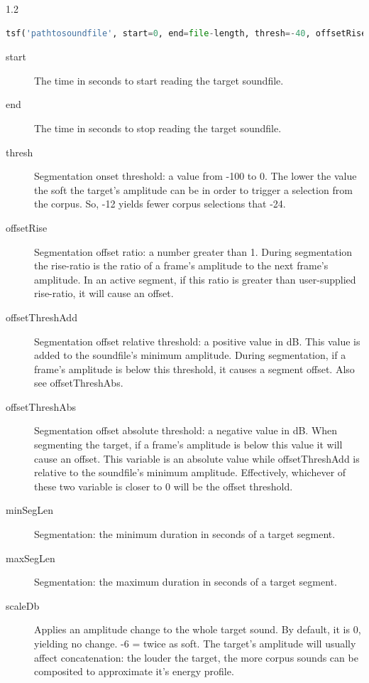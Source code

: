 \documentclass{article}
\begin{document}
\begin{spacing}{1.2}
\begin{lstlisting}[language=python]
tsf('pathtosoundfile', start=0, end=file-length, thresh=-40, offsetRise=1.5, offsetThreshAdd=+12, offsetThreshAbs=-80, scaleDb=0, minSegLen=0.05, maxSegLen=1000, midiPitchMethod='composite', stretch=1, segmentationFilepath=None)
\end{lstlisting}

\begin{description}
\item[start] The time in seconds to start reading the target soundfile.
\item[end] The time in seconds to stop reading the target soundfile.  
\item[thresh] Segmentation onset threshold: a value from -100 to 0.  The lower the value the soft the target's amplitude can be in order to trigger a selection from the corpus.  So, -12 yields fewer corpus selections that -24.  
\item[offsetRise] Segmentation offset ratio: a number greater than 1.   During segmentation the rise-ratio is the ratio of a frame's amplitude to the next frame's amplitude.   In an active segment, if this ratio is greater than user-supplied rise-ratio, it will cause an offset.
\item[offsetThreshAdd] Segmentation offset relative threshold: a positive value in dB.  
This value is added to the soundfile's minimum amplitude.  During segmentation, if a frame's amplitude is below this threshold, it causes a segment offset.  Also see offsetThreshAbs.
\item[offsetThreshAbs] Segmentation offset absolute threshold: a negative value in dB.  When segmenting the target, if a frame's amplitude is below this value it will cause an offset.  This variable is an absolute value while offsetThreshAdd is relative to the soundfile's minimum amplitude.  Effectively, whichever of these two variable is closer to 0 will be the offset threshold.
\item[minSegLen] Segmentation: the minimum duration in seconds of a target segment.
\item[maxSegLen] Segmentation: the maximum duration in seconds of a target segment.

\item[scaleDb] Applies an amplitude change to the whole target sound. By default, it is 0, yielding no change. -6 = twice as soft.  The target's amplitude will usually affect concatenation: the louder the target, the more corpus sounds can be composited to approximate it's energy profile.


\end{description}
\end{spacing}
\end{document}
